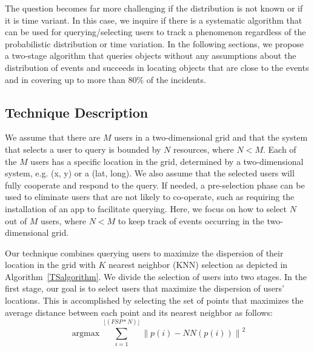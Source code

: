 \documentclass{acm_proc_article-sp}
\newcommand\floor[1]{\lfloor#1\rfloor}
\DeclareMathOperator*{\argmax}{argmax}
\newcommand{\norm}[1]{\left\lVert #1 \right\rVert}
\begin{document}
The question becomes far more challenging if the distribution is not known or if it is time variant. In this case, we inquire if there is a systematic algorithm that can be used for querying/selecting users to track a phenomenon regardless of the probabilistic distribution or time variation. In the following sections, we propose a two-stage algorithm that queries objects without any assumptions about the distribution of events and succeeds in locating objects that are close to the events and in covering up to more than $80\%$ of the incidents. \par

\subsection{Technique Description}
We assume that there are $M$ users in a two-dimensional grid and that the system that selects a user to query is bounded by $N$ resources, where $N < M$.  Each of the $M$ users has a specific location in the grid, determined by a two-dimensional system, e.g. (x, y) or a (lat, long). We also assume that the selected users will fully cooperate and respond to the query. If needed, a pre-selection phase can be used to eliminate users that are not likely to co-operate, such as requiring the installation of an app to facilitate querying. Here, we focus on how to select $N$ out of $M$ users, where $N < M$ to keep track of events occurring in the two-dimensional grid.\par

Our technique combines querying users to maximize the dispersion of their location in the grid with $K$ nearest neighbor (KNN) selection as depicted in Algorithm~\ref{TSalgorithm}. We divide the selection of users into two stages. In the first stage, our goal is to select users that maximize the dispersion of users' locations. This is accomplished by selecting the set of points that maximizes the average distance between each point and its nearest neighbor as follows:
\begin{equation} \label{eq:maxDisp}
\argmax \sum_{i=1}^{\floor{(FSP*N)}} \norm{p(i) - NN(p(i))}^2
\end{equation}
\end{document}
